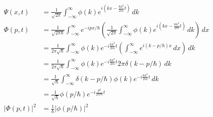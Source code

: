 \documentclass{article}
\begin{document}
\subsection{}

\begin{align*}
  \Psi(x, t)     & = \frac{1}{\sqrt{2 \pi}} \int_{-\infty}^\infty \phi(k) e^{i \left( k x - \frac{\hbar k^2}{2 m} t \right)} \,d k                                                                                            \\
  \Phi(p, t)     & = \frac{1}{\sqrt{2 \pi \hbar}} \int_{-\infty}^\infty e^{-i p x / \hbar} \left( \frac{1}{\sqrt{2 \pi}} \int_{-\infty}^\infty \phi(k) e^{i \left( k x - \frac{\hbar k^2}{2 m} t \right)} \,d k \right) \,d x \\
                 & = \frac{1}{2 \pi \sqrt{\hbar}} \int_{-\infty}^\infty \phi(k) e^{-i \frac{\hbar k^2}{2 m} t} \left( \int_{-\infty}^\infty e^{i (k - p / \hbar) x} \,d x \right) \,d k                                       \\
                 & = \frac{1}{2 \pi \sqrt{\hbar}} \int_{-\infty}^\infty \phi(k) e^{-i \frac{\hbar k^2}{2 m} t} 2 \pi \delta(k - p / \hbar) \,d k                                                                              \\
                 & = \frac{1}{\sqrt{\hbar}} \int_{-\infty}^\infty \delta(k - p / \hbar) \phi(k) e^{-i \frac{\hbar k^2}{2 m} t} \,d k                                                                                          \\
                 & = \frac{1}{\sqrt{\hbar}} \phi(p / \hbar) e^{-i \frac{p^2}{2 \hbar m} t}                                                                                                                                    \\
  |\Phi(p, t)|^2 & = \frac{1}{\hbar} |\phi(p / \hbar)|^2
\end{align*}

\setcounter{subsection}{13}
\subsection{}
\end{document}
